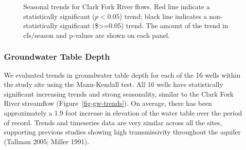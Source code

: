 \documentclass[
  letterpaper,
  DIV=11,
  numbers=noendperiod]{scrartcl}
\begin{document}
\begin{figure}


\caption{\label{fig-cfr-seas-trends}Seasonal trends for Clark Fork River
flows. Red line indicate a statistically significant (\(p<0.05\)) trend;
black line indicates a non- statistically significant
(\$\textgreater=0.05) trend. The amount of the trend in cfs/season and
p-values are shown on each panel.}

\end{figure}%

\subsubsection{Groundwater Table Depth}\label{groundwater-table-depth}

We evaluated trends in groundwater table depth for each of the 16 wells
within the study site using the Mann-Kendall test. All 16 wells have
statistically significant increasing trends and strong seasonality,
similar to the Clark Fork River streamflow (Figure~\ref{fig-gw-trends}).
On average, there has been approximately a 1.9 foot increase in
elevation of the water table over the period of record. Trends and
timeseries data are very similar across all the sites, supporting
previous studies showing high transmissivity throughout the aquifer
(Tallman 2005; Miller 1991).
\end{document}
